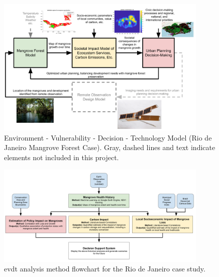 

\begin{figure}[!htb]
\centering
\includegraphics[width=0.9\textwidth]{Figures/chap4/MangroveModelFlow.png}
\caption[EVDT Model (Rio de Janeiro Mangrove Forest Case)]{Environment - Vulnerability - Decision - Technology Model (Rio de Janeiro Mangrove Forest Case). Gray, dashed lines and text indicate elements not included in this project.}
\label{fig:rio-evdt-flow}
\end{figure}

\begin{figure}[!htb]
\centering
\includegraphics[width=0.9\textwidth]{Figures/chap4/evdt-dss-flow.png}
\caption[EVDT Analysis Method Flowchart]{\ac{evdt} analysis method flowchart for the Rio de Janeiro case study.}
\label{fig:evdt-dss-flow}
\end{figure}


